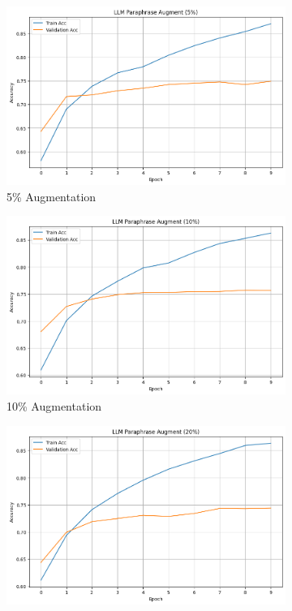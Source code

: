 \documentclass[10pt]{extarticle}
\begin{document}
\begin{figure}[ht]
  \centering
  \begin{subfigure}[b]{0.3\textwidth}
    \includegraphics[width=\textwidth]{img/llm_5_rnn.png}
    \caption{5\% Augmentation}
    \label{fig:llm_5_rnn}
  \end{subfigure}
  \hfill
  \begin{subfigure}[b]{0.3\textwidth}
    \includegraphics[width=\textwidth]{img/llm_10_rnn.png}
    \caption{10\% Augmentation}
    \label{fig:llm_10_rnn}
  \end{subfigure}
  \hfill
  \begin{subfigure}[b]{0.3\textwidth}
    \includegraphics[width=\textwidth]{img/llm_20_rnn.png}

\end{subfigure}
\end{figure}
\end{document}
